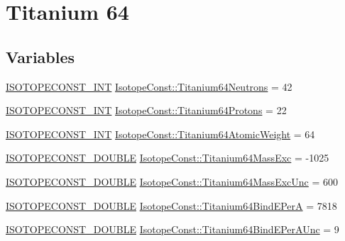 \hypertarget{group___isotope_const-_titanium-_ti64}{}\section{Titanium 64}
\label{group___isotope_const-_titanium-_ti64}
\subsection*{Variables}
\begin{DoxyCompactItemize}
\item 
\mbox{\hyperlink{group___isotope_const-_macros_ga5f18360b3e99483a35c32d789e62621c}{I\+S\+O\+T\+O\+P\+E\+C\+O\+N\+S\+T\+\_\+\+I\+NT}} \mbox{\hyperlink{group___isotope_const-_titanium-_ti64_gadaee1a9ea86119c3d379b6bbbadab545}{Isotope\+Const\+::\+Titanium64\+Neutrons}} = 42
\item 
\mbox{\hyperlink{group___isotope_const-_macros_ga5f18360b3e99483a35c32d789e62621c}{I\+S\+O\+T\+O\+P\+E\+C\+O\+N\+S\+T\+\_\+\+I\+NT}} \mbox{\hyperlink{group___isotope_const-_titanium-_ti64_ga241528d25a923bcf5f725fc919075408}{Isotope\+Const\+::\+Titanium64\+Protons}} = 22
\item 
\mbox{\hyperlink{group___isotope_const-_macros_ga5f18360b3e99483a35c32d789e62621c}{I\+S\+O\+T\+O\+P\+E\+C\+O\+N\+S\+T\+\_\+\+I\+NT}} \mbox{\hyperlink{group___isotope_const-_titanium-_ti64_ga70f93a2d7235cb5369e21e196b457990}{Isotope\+Const\+::\+Titanium64\+Atomic\+Weight}} = 64
\item 
\mbox{\hyperlink{group___isotope_const-_macros_ga8f45a7272ce02c0b4c65c44636ed719a}{I\+S\+O\+T\+O\+P\+E\+C\+O\+N\+S\+T\+\_\+\+D\+O\+U\+B\+LE}} \mbox{\hyperlink{group___isotope_const-_titanium-_ti64_ga30d5f44885e1cdcac6b2a65b06624efc}{Isotope\+Const\+::\+Titanium64\+Mass\+Exc}} = -\/1025
\item 
\mbox{\hyperlink{group___isotope_const-_macros_ga8f45a7272ce02c0b4c65c44636ed719a}{I\+S\+O\+T\+O\+P\+E\+C\+O\+N\+S\+T\+\_\+\+D\+O\+U\+B\+LE}} \mbox{\hyperlink{group___isotope_const-_titanium-_ti64_gaf0d0a8808af9f2d2043abed807775163}{Isotope\+Const\+::\+Titanium64\+Mass\+Exc\+Unc}} = 600
\item 
\mbox{\hyperlink{group___isotope_const-_macros_ga8f45a7272ce02c0b4c65c44636ed719a}{I\+S\+O\+T\+O\+P\+E\+C\+O\+N\+S\+T\+\_\+\+D\+O\+U\+B\+LE}} \mbox{\hyperlink{group___isotope_const-_titanium-_ti64_ga465cc9e1f32b650dbd7ceb182ef112c6}{Isotope\+Const\+::\+Titanium64\+Bind\+E\+PerA}} = 7818
\item 
\mbox{\hyperlink{group___isotope_const-_macros_ga8f45a7272ce02c0b4c65c44636ed719a}{I\+S\+O\+T\+O\+P\+E\+C\+O\+N\+S\+T\+\_\+\+D\+O\+U\+B\+LE}} \mbox{\hyperlink{group___isotope_const-_titanium-_ti64_ga28cbe7d89527adf2d0f5df9741d783de}{Isotope\+Const\+::\+Titanium64\+Bind\+E\+Per\+A\+Unc}} = 9

\end{DoxyCompactItemize}
